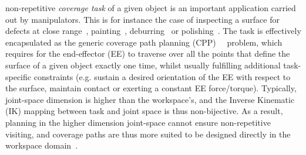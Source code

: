 \documentclass[journal]{IEEEtran}
\begin{document}
 non-repetitive \textit{coverage task} of a given object is an important application carried out by manipulators.
This is for instance the case of inspecting a surface for defects at close 
range~\cite{molina2017defects}, painting~\cite{li2011painting}, deburring~\cite{xie2016grinding} or polishing~\cite{tian2016polishing}. 
The task is effectively encapsulated as the generic coverage path planning (CPP)~\cite{choset2001coverage}~\cite{galceran2013a} problem, which requires for the end-effector (EE) to traverse over all the points that define the surface of a given object exactly one time, whilst usually fulfilling additional task-specific constraints (e.g.  sustain a desired orientation of the EE with respect to the surface, maintain contact or exerting a constant EE force/torque). 
Typically, joint-space dimension is higher than the workspace's, %
and the Inverse Kinematic (IK) mapping between task and joint space is thus non-bijective.  
As a result, planning in the higher dimension joint-space cannot ensure non-repetitive visiting, 
and coverage paths are thus more suited to be designed directly in the workspace domain~\cite{Oriolo2005Motion}.  
\end{document}
